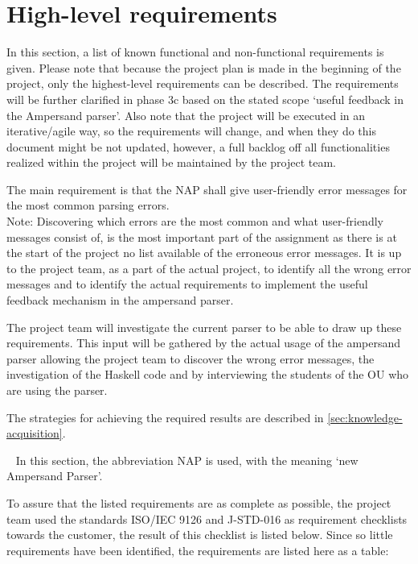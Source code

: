 \section{High-level requirements}
\label{sec:requirements}
In this section, a list of known functional and non-functional requirements is given.
Please note that because the project plan is made in the beginning of the project, only the highest-level requirements can be described.
The requirements will be further clarified in phase 3c based on the stated scope `useful feedback in the Ampersand parser'.
Also note that the project will be executed in an iterative/agile way, so the requirements will change, and when they do this document might be not updated, however, a full backlog off all functionalities realized within the project will be maintained by the project team.

The main requirement is that the NAP shall give user-friendly error messages for the most common parsing errors.\\
Note: Discovering which errors are the most common and what user-friendly messages consist of, is the most important part of the assignment as there is at the start of the project no list available of the erroneous error messages.
It is up to the project team, as a part of the actual project, to identify all the wrong error messages and to identify the actual requirements to implement the useful feedback mechanism in the ampersand parser.

The project team will investigate the current parser to be able to draw up these requirements.
This input will be gathered by the actual usage of the ampersand parser allowing the project team to discover the wrong error messages, the investigation of the Haskell code and by interviewing the students of the OU who are using the parser.

The strategies for achieving the required results are described in \autoref{sec:knowledge-acquisition}.

~\newline\noindent
In this section, the abbreviation NAP is used, with the meaning `new Ampersand Parser'.
%

To assure that the listed requirements are as complete as possible, the project team used the standards ISO/IEC 9126 \cite{iso-9126} and J-STD-016 \cite{jstd-016} as requirement checklists towards the customer, the result of this checklist is listed below.
Since so little requirements have been identified, the requirements are listed here as a table:

